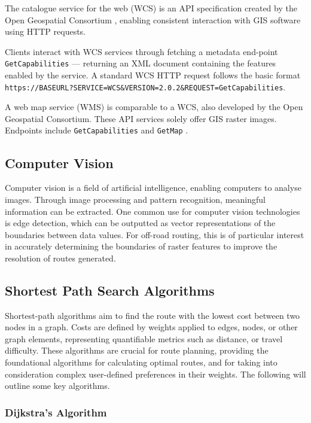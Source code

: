 \documentclass[12pt]{article}
\begin{document}
The catalogue service for the web (WCS) is an API specification created by the Open Geospatial Consortium \autocite{ogc_wcs}, enabling consistent interaction with GIS software using HTTP requests.

Clients interact with WCS services through fetching a metadata end-point \texttt{GetCapabilities} --- returning an XML document containing the features enabled by the service. A standard WCS HTTP request follows the basic format \texttt{https://BASEURL?SERVICE=WCS\&VERSION=2.0.2\&REQUEST=GetCapabilities}.

A web map service (WMS) is comparable to a WCS, also developed by the Open Geospatial Consortium. These API services solely offer GIS raster images. Endpoints include \texttt{GetCapabilities} and \texttt{GetMap} \autocite{ogc_wms}.

\subsection{Computer Vision}

Computer vision is a field of artificial intelligence, enabling computers to analyse images. Through image processing and pattern recognition, meaningful information can be extracted. One common use for computer vision technologies is edge detection, which can be outputted as vector representations of the boundaries between data values. For off-road routing, this is of particular interest in accurately determining the boundaries of raster features to improve the resolution of routes generated.

\subsection{Shortest Path Search Algorithms}

Shortest-path algorithms aim to find the route with the lowest cost between two nodes in a graph. Costs are defined by weights applied to edges, nodes, or other graph elements, representing quantifiable metrics such as distance, or travel difficulty. These algorithms are crucial for route planning, providing the foundational algorithms for calculating optimal routes, and for taking into consideration complex user-defined preferences in their weights. The following will outline some key algorithms.

\subsubsection{Dijkstra's Algorithm}
\end{document}
